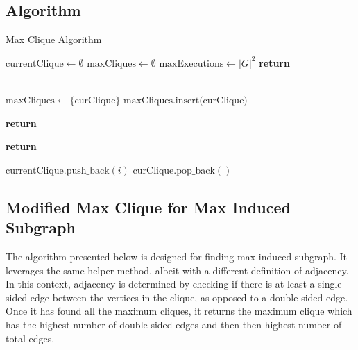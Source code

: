\subsection{Algorithm}
    \begin{algorithm}
    \caption{Max Clique Algorithm}
    \begin{algorithmic}[1]
        \State $\text{currentClique} \gets \emptyset$
        \State $\text{maxCliques} \gets \emptyset$
            \State $\text{maxExecutions} \gets |G|^2$
        \EndIf
        \State {}
        \State \textbf{return} 
    \EndProcedure
    
    \\
    
            \State $\text{maxCliques} \gets \{\text{curClique}\}$
        \EndIf
            \State $\text{maxCliques}\text{.insert(curClique)}$
        \EndIf
    
            \State \textbf{return}
        \EndIf
        
                \State \textbf{return}
            \EndIf
        \EndIf
    
                \State $\text{currentClique}.\text{push\_back}(i)$
                \State {}
                \State $\text{curClique}.\text{pop\_back}()$
            \EndIf
        \EndFor
    \EndProcedure
    \end{algorithmic}
    \end{algorithm}


\subsection{Modified Max Clique for Max Induced Subgraph}
The algorithm presented below is designed for finding max induced subgraph. It leverages the same helper method, albeit with a different definition of adjacency. In this context, adjacency is determined by checking if there is at least a single-sided edge between the vertices in the clique, as opposed to a double-sided edge. Once it has found all the maximum cliques, it returns the maximum clique which has the highest number of double sided edges and then then highest number of total edges. 

